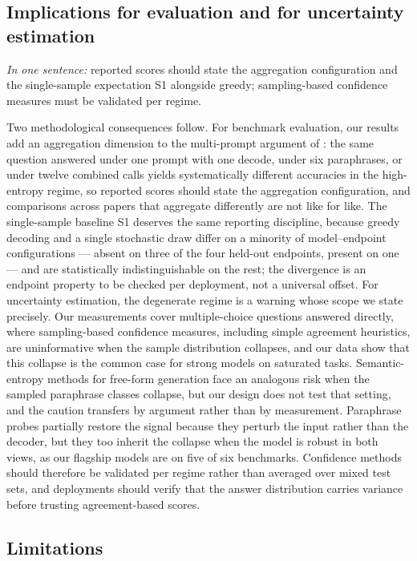 \subsection{Implications for evaluation and for uncertainty estimation}

\emph{In one sentence:} reported scores should state the aggregation configuration and the single-sample expectation S1 alongside greedy; sampling-based confidence measures must be validated per regime.

Two methodological consequences follow. For benchmark evaluation, our results add an aggregation dimension to the multi-prompt argument of \citet{mizrahi2024state}: the same question answered under one prompt with one decode, under six paraphrases, or under twelve combined calls yields systematically different accuracies in the high-entropy regime, so reported scores should state the aggregation configuration, and comparisons across papers that aggregate differently are not like for like. The single-sample baseline S1 deserves the same reporting discipline, because greedy decoding and a single stochastic draw differ on a minority of model--endpoint configurations --- absent on three of the four held-out endpoints, present on one --- and are statistically indistinguishable on the rest; the divergence is an endpoint property to be checked per deployment, not a universal offset. For uncertainty estimation, the degenerate regime is a warning whose scope we state precisely. Our measurements cover multiple-choice questions answered directly, where sampling-based confidence measures, including simple agreement heuristics, are uninformative when the sample distribution collapses, and our data show that this collapse is the common case for strong models on saturated tasks. Semantic-entropy methods for free-form generation \citep{kuhn2023semantic,farquhar2024detecting} face an analogous risk when the sampled paraphrase classes collapse, but our design does not test that setting, and the caution transfers by argument rather than by measurement. Paraphrase probes partially restore the signal because they perturb the input rather than the decoder, but they too inherit the collapse when the model is robust in both views, as our flagship models are on five of six benchmarks. Confidence methods should therefore be validated per regime rather than averaged over mixed test sets, and deployments should verify that the answer distribution carries variance before trusting agreement-based scores.

\subsection{Limitations}
\label{sec:limits}

